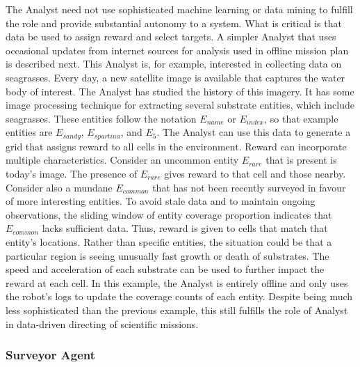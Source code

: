 \documentclass{tamuccthesis}
\begin{document}
The Analyst need not use sophisticated machine learning or data mining to fulfill the role and provide substantial autonomy to a system. What is critical is that data be used to assign reward and select targets. A simpler Analyst that uses occasional updates from internet sources for analysis used in offline mission plan is described next. This Analyst is, for example, interested in collecting data on seagrasses. Every day, a new satellite image is available that captures the water body of interest. The Analyst has studied the history of this imagery. It has some image processing technique for extracting several substrate entities, which include seagrasses. These entities follow the notation $E_{name}$ or $E_{index}$, so that example entities are $E_{sandy}$, $E_{spartina}$, and $E_{5}$. The Analyst can use this data to generate a grid that assigns reward to all cells in the environment. Reward can incorporate multiple characteristics. Consider an uncommon entity $E_{rare}$ that is present is today's image. The presence of $E_{rare}$ gives reward to that cell and those nearby. Consider also a mundane $E_{common}$ that has not been recently surveyed in favour of more interesting entities. To avoid stale data and to maintain ongoing observations, the sliding window of entity coverage proportion indicates that $E_{common}$ lacks sufficient data. Thus, reward is given to cells that match that entity's locations. Rather than specific entities, the situation could be that a particular region is seeing unusually fast growth or death of substrates. The speed and acceleration of each substrate can be used to further impact the reward at each cell. In this example, the Analyst is entirely offline and only uses the robot's logs to update the coverage counts of each entity. Despite being much less sophisticated than the previous example, this still fulfills the role of Analyst in data-driven directing of scientific missions. 

\subsubsection{Surveyor Agent}
\end{document}
